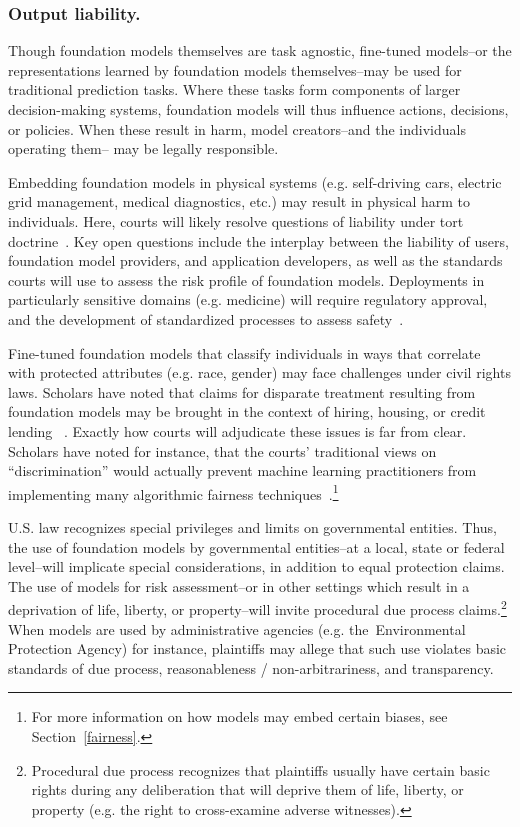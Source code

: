 \subsubsection{Output liability.} Though foundation models themselves are task agnostic, fine-tuned models--or the representations learned by foundation models themselves--may be used for traditional prediction tasks. Where these tasks form components of larger decision-making systems, foundation models will thus influence actions, decisions, or policies. When these result in harm, model creators--and the individuals operating them-- may be legally responsible. 

Embedding foundation models in physical systems (e.g. self-driving cars, electric grid management, medical diagnostics, etc.) may result in physical harm to individuals. Here, courts will likely resolve questions of liability under tort doctrine~\citep{lemley2019remedies, selbst2020negligence}. Key open questions include the interplay between the liability of users, foundation model providers, and application developers, as well as the standards courts will use to assess the risk profile of foundation models. Deployments in particularly sensitive domains (e.g. medicine) will require regulatory approval, and the development of standardized processes to assess safety~\citep{wu2021medical}.

Fine-tuned foundation models that classify individuals in ways that correlate with protected attributes (e.g. race, gender) may face challenges under civil rights laws. Scholars have noted that claims for disparate treatment resulting from foundation models may be brought in the context of hiring, housing, or credit lending ~\citep{gillis2019big, scherer2019applying}. Exactly how courts will adjudicate these issues is far from clear.  Scholars have noted for instance, that the courts’ traditional views on ``discrimination'' would actually prevent machine learning practitioners from implementing many algorithmic fairness techniques~\citep{xiang2021reconciling, ho2020affirmative}.\footnote{For more information on how models may embed certain biases, see Section~\ref{fairness}.} 

U.S. law recognizes special privileges and limits on governmental entities. Thus, the use of foundation models by governmental entities--at a local, state or federal level--will implicate special considerations, in addition to equal protection claims. The use of models for risk assessment--or in other settings which result in a deprivation of life, liberty, or property--will invite procedural due process claims.\footnote{Procedural due process recognizes that plaintiffs usually have certain basic rights during any deliberation that will deprive them of life, liberty, or property (e.g. the right to cross-examine adverse witnesses).} When models are used by administrative agencies (e.g. the~Environmental Protection Agency) for instance, plaintiffs may allege that such use violates basic standards of due process, reasonableness / non-arbitrariness, and transparency. 

